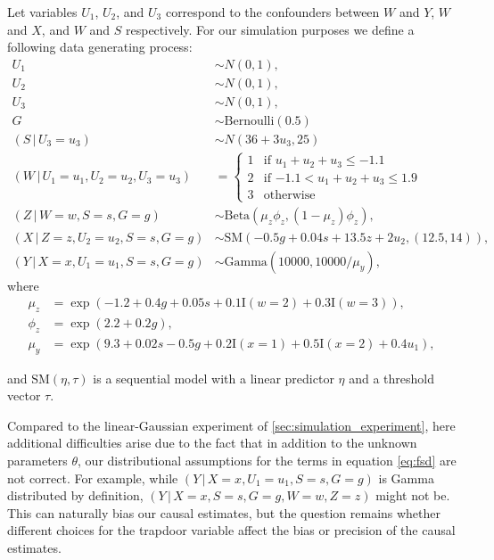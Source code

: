 \documentclass[11pt,a4paper,twoside]{article}
\newcommand{\+}[1]{\ensuremath{\mathbf{#1}}}
\newcommand{\given}{{ \, | \, }}
\begin{document}
    Let variables $U_1$, $U_2$, and $U_3$ correspond to the confounders between $W$ and $Y$, $W$ and $X$, and $W$ and $S$ respectively. For our simulation purposes we define a following data generating process:
	\begin{equation*}
	\label{eq:nongaussian}
	\begin{aligned}
	U_1 &\sim N(0, 1),\\
	U_2 &\sim N(0, 1),\\
	U_3 &\sim N(0, 1),\\
	G &\sim \text{Bernoulli}(0.5)\\
	(S \given U_3 = u_3) & \sim N(36 + 3 u_3, 25)\\
	(W \given U_1 = u_1, U_2 = u_2, U_3 = u_3) &=  \begin{cases}
	1 & \text{if $u_1 + u_2 + u_3 \leq -1.1$}\\
	2 & \text{if $-1.1 < u_1 + u_2 + u_3 \leq 1.9$}\\
	3 & \text{otherwise}
	\end{cases}\\
	(Z \given W = w, S = s, G = g) &\sim \text{Beta}(\mu_z \phi_z, (1 - \mu_z)\phi_z),\\
	(X \given Z = z, U_2 = u_2, S = s, G = g) &\sim \text{SM}(-0.5 g + 0.04 s + 13.5 z + 2 u_2, (12.5, 14)),\\
	(Y \given X = x, U_1 = u_1, S = s, G = g) &\sim \text{Gamma}(10000, 10000 / \mu_y),
	\end{aligned}
	\end{equation*}
	where 
	\begin{equation*}
	\begin{aligned}
	\mu_z &= \exp(-1.2 + 0.4 g + 0.05 s + 0.1 \textrm{I}(w = 2) + 0.3 \textrm{I}(w = 3)), \\
	\phi_z &= \exp(2.2 + 0.2 g), \\
	\mu_y &= \exp(9.3 + 0.02 s - 0.5 g + 0.2 \textrm{I}(x = 1) + 0.5 \textrm{I}(x = 2) + 0.4 u_1),
	\end{aligned}
	\end{equation*}
	
	 and $\text{SM}(\eta, \tau)$ is a sequential model \citep{Tutz1990, burkner2019} with a linear predictor $\eta$ and a threshold vector $\tau$.

	Compared to the linear-Gaussian experiment of \autoref{sec:simulation_experiment}, here additional difficulties arise due to the fact that in addition to the unknown parameters $\theta$, our distributional assumptions for the terms in equation \eqref{eq:fsd} are not correct. For example, while $(Y \given X = x, U_1 = u_1, S = s, G = g)$ is Gamma distributed by definition, $(Y \given X = x, S = s, G = g, W = w, Z = z)$ might not be. This can naturally bias our causal estimates, but the question remains whether different choices for the trapdoor variable affect the bias or precision of the causal estimates.
	
\end{document}
